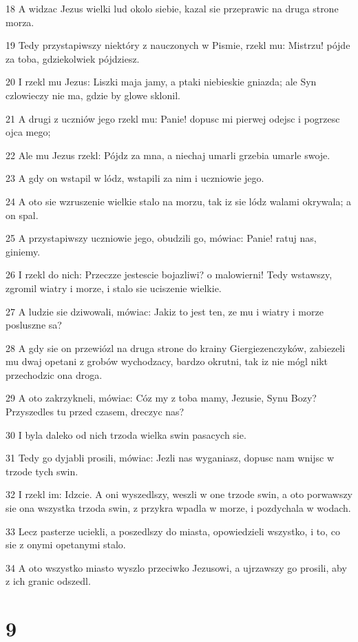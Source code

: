 \par 18 A widzac Jezus wielki lud okolo siebie, kazal sie przeprawic na druga strone morza.
\par 19 Tedy przystapiwszy niektóry z nauczonych w Pismie, rzekl mu: Mistrzu! pójde za toba, gdziekolwiek pójdziesz.
\par 20 I rzekl mu Jezus: Liszki maja jamy, a ptaki niebieskie gniazda; ale Syn czlowieczy nie ma, gdzie by glowe sklonil.
\par 21 A drugi z uczniów jego rzekl mu: Panie! dopusc mi pierwej odejsc i pogrzesc ojca mego;
\par 22 Ale mu Jezus rzekl: Pójdz za mna, a niechaj umarli grzebia umarle swoje.
\par 23 A gdy on wstapil w lódz, wstapili za nim i uczniowie jego.
\par 24 A oto sie wzruszenie wielkie stalo na morzu, tak iz sie lódz walami okrywala; a on spal.
\par 25 A przystapiwszy uczniowie jego, obudzili go, mówiac: Panie! ratuj nas, giniemy.
\par 26 I rzekl do nich: Przeczze jestescie bojazliwi? o malowierni! Tedy wstawszy, zgromil wiatry i morze, i stalo sie uciszenie wielkie.
\par 27 A ludzie sie dziwowali, mówiac: Jakiz to jest ten, ze mu i wiatry i morze posluszne sa?
\par 28 A gdy sie on przewiózl na druga strone do krainy Giergiezenczyków, zabiezeli mu dwaj opetani z grobów wychodzacy, bardzo okrutni, tak iz nie mógl nikt przechodzic ona droga.
\par 29 A oto zakrzykneli, mówiac: Cóz my z toba mamy, Jezusie, Synu Bozy? Przyszedles tu przed czasem, dreczyc nas?
\par 30 I byla daleko od nich trzoda wielka swin pasacych sie.
\par 31 Tedy go dyjabli prosili, mówiac: Jezli nas wyganiasz, dopusc nam wnijsc w trzode tych swin.
\par 32 I rzekl im: Idzcie. A oni wyszedlszy, weszli w one trzode swin, a oto porwawszy sie ona wszystka trzoda swin, z przykra wpadla w morze, i pozdychala w wodach.
\par 33 Lecz pasterze uciekli, a poszedlszy do miasta, opowiedzieli wszystko, i to, co sie z onymi opetanymi stalo.
\par 34 A oto wszystko miasto wyszlo przeciwko Jezusowi, a ujrzawszy go prosili, aby z ich granic odszedl.

\chapter{9}

